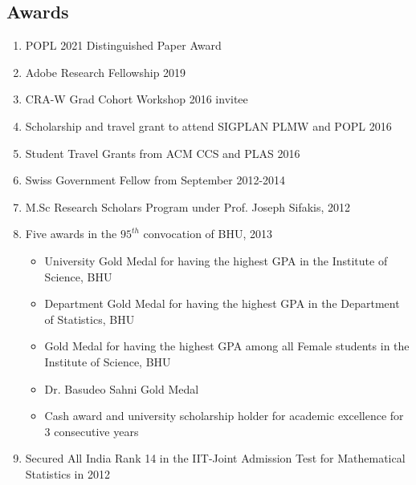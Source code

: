 \documentclass[margin, 10pt]{res} %
\begin{document}
\begin{resume}
\section{Awards}
\begin{enumerate}[itemsep=.5pt]
\item POPL 2021 Distinguished Paper Award
\item Adobe Research Fellowship 2019
\item CRA-W Grad Cohort Workshop 2016 invitee
\item Scholarship and travel grant to attend SIGPLAN PLMW and POPL 2016
\item Student Travel Grants from ACM CCS and PLAS 2016
\item Swiss Government Fellow from September 2012-2014
\item M.Sc Research Scholars Program under Prof. Joseph Sifakis, 2012
\item Five awards in the $95^{th}$ convocation of BHU, 2013
\begin{itemize}\itemsep -2pt
\item University Gold Medal for having the highest GPA in the
  Institute of Science, BHU
\item Department Gold Medal for having the highest GPA in the Department of Statistics, BHU
\item Gold Medal for having the highest GPA among all Female students in the
  Institute of Science, BHU
\item Dr. Basudeo Sahni Gold Medal
\item Cash award and university scholarship holder for academic excellence
  for 3 consecutive years
\end{itemize}
\item Secured All India Rank 14 in the IIT-Joint Admission Test for Mathematical Statistics in 2012
\end{enumerate}


\end{resume}
\end{document}
